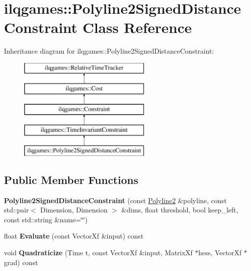 \hypertarget{classilqgames_1_1_polyline2_signed_distance_constraint}{}\section{ilqgames\+:\+:Polyline2\+Signed\+Distance\+Constraint Class Reference}
\label{classilqgames_1_1_polyline2_signed_distance_constraint}
Inheritance diagram for ilqgames\+:\+:Polyline2\+Signed\+Distance\+Constraint\+:\begin{figure}[H]
\begin{center}
\leavevmode
\includegraphics[height=5.000000cm]{classilqgames_1_1_polyline2_signed_distance_constraint}
\end{center}
\end{figure}
\subsection*{Public Member Functions}
\begin{DoxyCompactItemize}
\item 
{\bfseries Polyline2\+Signed\+Distance\+Constraint} (const \hyperlink{classilqgames_1_1_polyline2}{Polyline2} \&polyline, const std\+::pair$<$ Dimension, Dimension $>$ \&dims, float threshold, bool keep\+\_\+left, const std\+::string \&name=\char`\"{}\char`\"{})\hypertarget{classilqgames_1_1_polyline2_signed_distance_constraint_ad6078fff38b6cd1bb5e98c66f5b0c088}{}\label{classilqgames_1_1_polyline2_signed_distance_constraint_ad6078fff38b6cd1bb5e98c66f5b0c088}

\item 
float {\bfseries Evaluate} (const Vector\+Xf \&input) const \hypertarget{classilqgames_1_1_polyline2_signed_distance_constraint_a0444085e8eb892f91139b92c0bc4fe63}{}\label{classilqgames_1_1_polyline2_signed_distance_constraint_a0444085e8eb892f91139b92c0bc4fe63}

\item 
void {\bfseries Quadraticize} (Time t, const Vector\+Xf \&input, Matrix\+Xf $\ast$hess, Vector\+Xf $\ast$grad) const \hypertarget{classilqgames_1_1_polyline2_signed_distance_constraint_a9207da963c5944961d8dd38e780bb37e}{}\label{classilqgames_1_1_polyline2_signed_distance_constraint_a9207da963c5944961d8dd38e780bb37e}

\end{DoxyCompactItemize}
